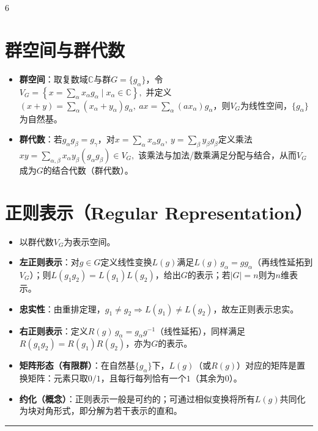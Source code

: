 \documentclass[landscape]{article}
\begin{document}
\begin{multicols*}{6}
\section*{群空间与群代数}
\begin{itemize}
  \item \textbf{群空间}：取复数域$\mathbb{C}$与群$G=\{g_\alpha\}$，令
  \\
  $
  V_G=\left\{x=\sum_{\alpha} x_{\alpha}g_{\alpha}\mid x_\alpha\in\mathbb{C}\right\},
  $
  并定义$(x+y)=\sum_\alpha(x_\alpha+y_\alpha)g_\alpha,\ a x=\sum_\alpha(ax_\alpha)g_\alpha$，则$V_G$为线性空间，$\{g_\alpha\}$为自然基。
  \item \textbf{群代数}：若$g_\alpha g_\beta=g_\gamma$，对$x=\sum_\alpha x_\alpha g_\alpha,\ y=\sum_\beta y_\beta g_\beta$定义乘法
  \\
  $
  xy=\sum_{\alpha,\beta} x_\alpha y_\beta (g_\alpha g_\beta)\in V_G,
  $
  该乘法与加法/数乘满足分配与结合，从而$V_G$成为$G$的结合代数（群代数）。
\end{itemize}

\section*{正则表示（Regular Representation）}
\begin{itemize}
  \item 以群代数$V_G$为表示空间。
  \item \textbf{左正则表示}：对$g\in G$定义线性变换$L(g)$满足$L(g)\,g_\alpha=gg_\alpha$（再线性延拓到$V_G$）；则$L(g_1g_2)=L(g_1)L(g_2)$，给出$G$的表示；若$|G|=n$则为$n$维表示。
  \item \textbf{忠实性}：由重排定理，$g_1\neq g_2\Rightarrow L(g_1)\neq L(g_2)$，故左正则表示忠实。
  \item \textbf{右正则表示}：定义$R(g)\,g_\alpha=g_\alpha g^{-1}$（线性延拓），同样满足$R(g_1g_2)=R(g_1)R(g_2)$，亦为$G$的表示。
  \item \textbf{矩阵形态（有限群）}：在自然基$\{g_\alpha\}$下，$L(g)$（或$R(g)$）对应的矩阵是置换矩阵：元素只取$0/1$，且每行每列恰有一个$1$（其余为$0$）。
  \item \textbf{约化（概念）}：正则表示一般是可约的；可通过相似变换将所有$L(g)$共同化为块对角形式，即分解为若干表示的直和。
\end{itemize}
\noindent\textcolor{red}{\rule{\linewidth}{1pt}}

\end{multicols*}
\end{document}
